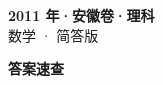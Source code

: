 \documentclass[zihao=-4, a4paper]{ctexart}
\begin{document}
\begin{center}
  {\Large\bfseries 2011 年·安徽卷·理科}\\[4pt]
  {\large 数学 · 简答版}
\end{center}
\medskip
{}

\clearpage
{}
\begin{center}{\Large\bfseries 答案速查}\end{center}
\medskip

\end{document}
